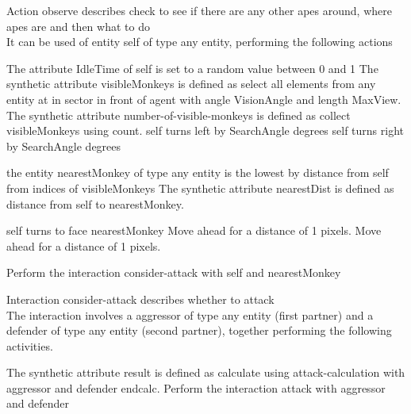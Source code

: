 \documentclass{article}
\begin{document}
\parbox{\linewidth}{
Action {\color{purple}observe} describes check to see if there are any other apes around, where apes are and then what to do\\
It can be used of entity {\color{orange}self} of type any entity, performing the following actions\\
\begin{algorithm}[H]
The attribute {\color{blue}IdleTime} of  self is set to a random value between 0 and 1\;
The synthetic attribute {\color{blue}visibleMonkeys} is defined as select all elements from any entity at in sector in front of agent  with angle  VisionAngle  and length  MaxView.\;
The synthetic attribute {\color{blue}number-of-visible-monkeys} is defined as collect {\color{blue}visibleMonkeys} using count.\;
{
    {
        {\color{orange}self}  turns  left  by  {\color{blue}SearchAngle}  degrees
    }
    {
        {\color{orange}self}  turns  right  by  {\color{blue}SearchAngle}  degrees
    }
}{
    the entity {\color{orange}nearestMonkey} of type any entity  is the  lowest  by  distance  from  {\color{orange}self}  from  indices of {\color{blue}visibleMonkeys}\;
    The synthetic attribute {\color{blue}nearestDist} is defined as distance  from  {\color{orange}self}  to  nearestMonkey.\;
    {
    
    {
        {\color{orange}self}  turns to face  {\color{orange}nearestMonkey}\;
        Move ahead for a distance of 1 pixels.\;
    }
    {
        Move ahead for a distance of 1 pixels.
    }
    }
    {
        Perform the interaction {\color{purple}consider-attack} with {\color{orange}self} and {\color{orange}nearestMonkey}
    }
    
}
\end{algorithm}
\hline
}

\parbox{\linewidth}{
Interaction {\color{purple}consider-attack} describes whether to attack\\
The interaction involves a {\color{orange}aggressor} of type any entity (first partner) and a {\color{orange}defender} of type any entity (second partner), together performing the following activities.\\
\begin{algorithm}[H]
    The synthetic attribute {\color{blue}result} is defined as calculate using {\color{purple}attack-calculation} with {\color{orange}aggressor} and {\color{orange}defender} endcalc.\;
    {
        Perform the interaction {\color{purple}attack} with {\color{orange}aggressor} and {\color{orange}defender}
    }
\end{algorithm}
\hline
}
\end{document}
